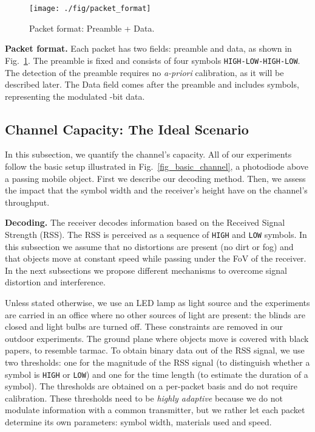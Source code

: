 \documentclass[10pt]{sig-alternate-05-2015}
\begin{document}
{\begin{figure}[t]
	\centering
	\texttt{[image: ./fig/packet\_format]}
	\vspace{-2mm}
	\caption {Packet format: Preamble + Data.}
	\label{fig_pkt_format}
	\vspace{-4mm}
\end{figure}

{\bf Packet format.}   
Each packet has two fields: preamble and data, as shown in Fig.~\ref{fig_pkt_format}. The preamble is fixed and consists of four symbols \texttt{HIGH-LOW-HIGH-LOW}. The detection of the preamble requires no \emph{a-priori} calibration, as it will be described later. The Data field comes after the preamble and includes  symbols, representing the modulated -bit data.

\subsection{Channel Capacity: The Ideal Scenario} \label{sec_ideal_scenarios}

In this subsection, we quantify the channel's capacity. All of our experiments follow the basic setup illustrated in Fig.~\ref{fig_basic_channel}, a photodiode above a passing mobile object. First we describe our decoding method. Then, we assess the impact that the symbol width and the receiver's height have on the channel's throughput.

\textbf{Decoding.} The receiver decodes information based on the Received Signal Strength (RSS). The RSS is perceived as a sequence of  \texttt{HIGH} and \texttt{LOW} symbols. In this subsection we assume that no distortions are present (no dirt or fog) and that objects move at constant speed while passing under the FoV of the receiver. In the next subsections we propose different mechanisms to overcome signal distortion and interference.

Unless stated otherwise, we use an LED lamp as light source and the experiments are carried in an office where no other sources of light are present: the blinds are closed and light bulbs are turned off. These constraints are removed in our outdoor experiments. The ground plane where objects move is covered with black papers, to resemble tarmac. To obtain binary data out of the RSS signal, we use two thresholds: one for the magnitude of the RSS signal  (to distinguish whether a symbol is \texttt{HIGH} or \texttt{LOW}) and one for the time length  (to estimate the duration of a symbol). The thresholds are obtained on a per-packet basis and do not require calibration. These thresholds need to be \emph{highly adaptive} because we do not modulate information with a common transmitter, but we rather let each packet determine its own parameters: symbol width, materials used and speed.

}
\end{document}
